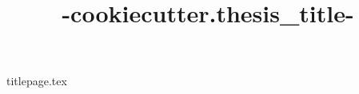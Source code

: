 \documentclass{book}
\title{ {{-cookiecutter.thesis_title-}} }
\author{\givenname \surname}
\begin{document}
{titlepage.tex}
\end{document}
